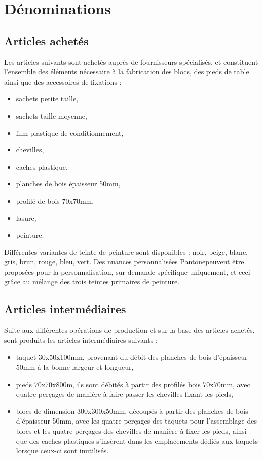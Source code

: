 \section{Dénominations}

\subsection{Articles achetés}

Les articles suivants sont achetés auprès de fournisseurs spécialisés,
et constituent l'ensemble des éléments nécessaire à la fabrication des blocs,
des pieds de table ainsi que des accessoires de fixations :

\begin{itemize}
	\item sachets petite taille,
	\item sachets taille moyenne,
	\item film plastique de conditionnement,
	\item chevilles,
	\item caches plastique,
	\item planches de bois épaisseur 50mm,
	\item profilé de bois 70x70mm,
	\item lasure,
	\item peinture.
\end{itemize}

Différentes variantes de teinte de peinture sont disponibles :
noir, beige, blanc, gris, brun, rouge, bleu, vert.
Des nuances personnalisées Pantone\textregistered peuvent être proposées
pour la personnalisation, sur demande spécifique uniquement, et ceci grâce
au mélange des trois teintes primaires de peinture.

\subsection{Articles intermédiaires}

Suite aux différentes opérations de production et sur la base des articles
achetés, sont produits les articles intermédiaires suivants :

\begin{itemize}
	\item taquet 30x50x100mm, provenant du débit des planches de bois
	d'épaisseur 50mm à la bonne largeur et longueur,
	\item pieds 70x70x800m, ils sont débités à partir des profilés bois
	70x70mm, avec quatre perçages de manière à faire passer les chevilles
	fixant les pieds,
	\item blocs de dimension 300x300x50mm, découpés à partir des planches de
	bois d'épaisseur 50mm, avec les quatre perçages des taquets pour l'assemblage
	des blocs et les quatre perçages des chevilles de manière à fixer les pieds,
	ainsi que des caches plastiques s'insèrent dans les emplacements dédiés
	aux taquets lorsque ceux-ci sont inutilisés.
\end{itemize}

